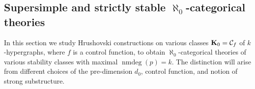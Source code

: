 \documentclass[11pt]{amsart}
\def\bK{{\bf K}}
\def\nmdeg{\mathop{\rm nmdeg}}
\newcommand{\sidebar}[1]{\vskip10pt\noindent
 \hskip.70truein\vrule width2.0pt\hskip.5em
 \vbox{\hsize= 4truein\noindent\footnotesize\relax #1 }\vskip10pt\noindent}
\def\nmdeg{\operatorname{nmdeg}}
\DeclareMathOperator{\acl}{acl}
\def\cl{\operatorname{cl}}
\newtheorem{lemma}[theorem]{Lemma}
\theoremstyle{definition}
\newtheorem{definition}[theorem]{Definition}
\theoremstyle{remark}
\numberwithin{equation}{section}
\begin{document}
\subsection{Supersimple and strictly stable $\aleph_0$-categorical theories}\label{ocat}

In this section we study Hrushovski constructions on various classes
$\bK_0 = \mathcal{C}_{f}$ of $k$-hypergraphs, where $f$ is a control function, to obtain $\aleph_0$-categorical theories of various
stability classes with maximal $\nmdeg(p) =k$. The distinction will arise
from different choices of the pre-dimension $d_0$, control function, and
notion of strong substructure.


%
%
%
%
%
%
%
%
%
%
\end{document}
